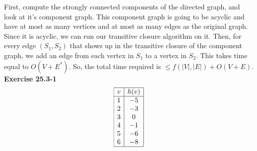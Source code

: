 \documentclass{article}
\begin{document}
First, compute the strongly connected components of the directed graph, and look at it's component graph. This component graph is going to be acyclic and have at most as many vertices and at most as many edges as the original graph. Since it is acyclic, we can run our transitive closure algorithm on it. Then, for every edge $(S_1,S_2)$ that shows up in the transitive closure of the component graph, we add an edge from each vertex in $S_1$ to a vertex in $S_2$. This takes time equal to $O(V+E^*)$. So, the total time required is $\le f(|V|,|E|) + O(V+E)$.\\

\noindent\textbf{Exercise 25.3-1}\\

\[
\begin{array}{|c|c|}
\hline
v&h(v)\\
\hline
1&-5\\
2&-3\\
3&0\\
4&-1\\
5&-6\\
6&-8\\
\hline
\end{array}
\]
\end{document}

